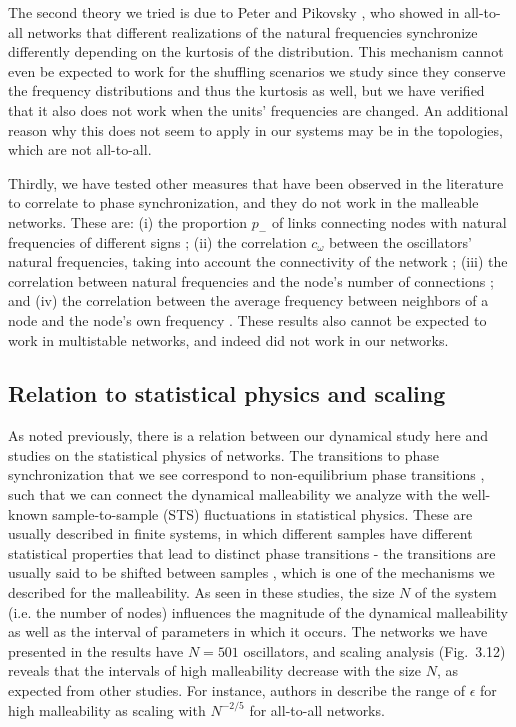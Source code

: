 The second theory we tried is due to Peter and Pikovsky \cite{peter2018transition}, who showed in all-to-all networks that different realizations of the natural frequencies synchronize differently depending on the kurtosis of the distribution. This mechanism cannot even be expected to work for the shuffling scenarios we study since they conserve the frequency distributions and thus the kurtosis as well, but we have verified that it also does not work when the units' frequencies are changed. An additional reason why this does not seem to apply in our systems may be in the topologies, which are not all-to-all.

Thirdly, we have tested other measures that have been observed in the literature to correlate to phase synchronization, and they do not work in the malleable networks. These are: (i) the proportion $p_-$ of links connecting nodes with natural frequencies of different signs \cite{brede2008synchrony};  (ii) the correlation $c_\omega$ between the oscillators' natural frequencies, taking into account the connectivity of the network \cite{brede2008synchrony, carareto2009optimized}; (iii) the correlation between natural frequencies and the node's number of connections \cite{skardal2014optimal}; and (iv) the correlation between the average frequency between neighbors of a node and the node's own frequency \cite{buzna2009synchronization, skardal2014optimal}. These results also cannot be expected to work in multistable networks, and indeed did not work in our networks. 


\subsection*{Relation to statistical physics and scaling}
As noted previously, there is a relation between our dynamical study here and studies on the statistical physics of networks. The transitions to phase synchronization that we see correspond to non-equilibrium phase transitions \cite{kuramoto1984chemical, peter2018transition}, such that we can connect the dynamical malleability we analyze with the well-known sample-to-sample (STS) fluctuations in statistical physics. These are usually described in finite systems, in which different samples have different statistical properties that lead to distinct phase transitions - the transitions are usually said to be shifted between samples \cite{sornette2006critical, hong2007finitesizescalingpre, hong2007entrainment}, which is one of the mechanisms we described for the malleability.
As seen in these studies, the size $N$ of the system (i.e. the number of nodes) influences the magnitude of the dynamical malleability as well as the interval of parameters in which it occurs. The networks we have presented in the results have $N = 501$ oscillators, and scaling analysis (Fig.~3.12) reveals that the intervals of high malleability decrease with the size $N$, as expected from other studies. For instance, authors in \cite{hong2007entrainment} describe the range of $\epsilon$ for high malleability as scaling with $N^{-2/5}$ for all-to-all networks. 

